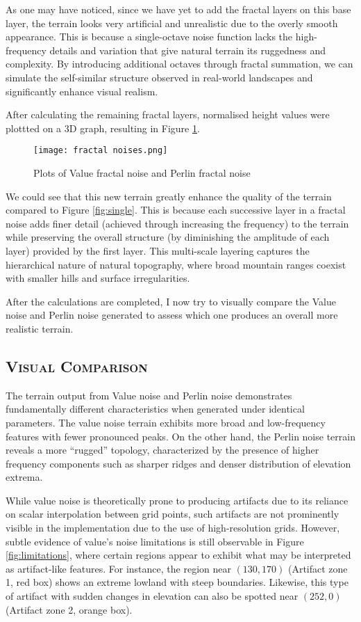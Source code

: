 As one may have noticed, since we have yet to add the fractal layers on this base layer, the terrain looks very artificial and unrealistic due to 
the overly smooth appearance. This is because a single-octave noise function lacks the high-frequency details and variation that give natural terrain 
its ruggedness and complexity. By introducing additional octaves through fractal summation, we can simulate the self-similar structure observed in 
real-world landscapes and significantly enhance visual realism. 

After calculating the remaining fractal layers, normalised height values were plottted on a 3D graph, resulting in Figure \ref{fig:plot_vf_pf}. 
\begin{figure}[H]
    \centering
    \texttt{[image: fractal noises.png]}
    \caption{Plots of Value fractal noise and Perlin fractal noise}
    \label{fig:plot_vf_pf}
\end{figure}
We could see that this new terrain greatly enhance the quality of the terrain compared to Figure \ref{fig:single}. This is because each successive layer 
in a fractal noise adds finer detail (achieved through increasing the frequency) to the terrain while preserving the overall structure (by diminishing 
the amplitude of each layer) provided by the first layer. This multi-scale layering captures the hierarchical nature of natural topography, where broad 
mountain ranges coexist with smaller hills and surface irregularities.

After the calculations are completed, I now try to visually compare the Value noise and Perlin noise generated to assess which one produces an overall 
more realistic terrain.

\subsection{\textsc{Visual Comparison}}
\vspace*{-10pt}
The terrain output from Value noise and Perlin noise demonstrates fundamentally different characteristics when generated under identical parameters. 
The value noise terrain exhibits more broad and low-frequency features with fewer pronounced peaks. On the other hand, the Perlin noise terrain reveals 
a more “rugged” topology, characterized by the presence of higher frequency components such as sharper ridges and denser distribution of elevation extrema.  

While value noise is theoretically prone to producing artifacts due to its reliance on scalar interpolation between grid points, such artifacts are not 
prominently visible in the implementation due to the use of high-resolution grids. However, subtle evidence of value's noise limitations is still observable 
in Figure \ref{fig:limitations}, where certain regions appear to exhibit what may be interpreted as artifact-like features. For instance, the region near $(130,170)$ (Artifact 
zone 1, red box) shows an extreme lowland with steep boundaries. Likewise, this type of artifact with sudden changes in elevation can also be spotted near 
$(252,0)$ (Artifact zone 2, orange box). 

